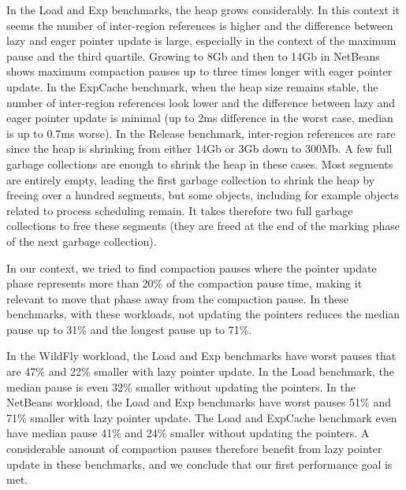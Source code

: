 \documentclass[sigplan,10pt,review,anonymous]{acmart}\settopmatter{printfolios=true,printccs=false,printacmref=false}
\newcommand{\egb}[1]{\color{blue}\fbox{\bfseries\sffamily\scriptsize Elisa:}{\sf\small$\blacktriangleright$\textit{#1}$\blacktriangleleft$}\color{black}}
\def\bestMedian{31\%\xspace}
\def\bestWorst{71\%\xspace}
\begin{document}
In the Load and Exp benchmarks, the heap grows considerably. In this context it seems the number of inter-region references is higher and the difference between lazy and eager pointer update is large, especially in the context of the maximum pause and the third quartile. Growing to 8Gb and then to 14Gb in NetBeans shows maximum compaction pauses up to three times longer with eager pointer update. In the ExpCache benchmark, when the heap size remains stable, the number of inter-region references look lower and the difference between lazy and eager pointer update is minimal (up to 2ms difference in the worst case, median is up to 0.7ms worse). In the Release benchmark, inter-region references are rare since the heap is shrinking from either 14Gb or 3Gb down to 300Mb. A few full garbage collections are enough to shrink the heap in these cases. Most segments are entirely empty, leading the first garbage collection to shrink the heap by freeing over a hundred segments, but some objects, including for example objects related to process scheduling remain. It takes therefore two full garbage collections to free these segments (they are freed at the end of the marking phase of the next garbage collection).

In our context, we tried to find compaction pauses where the pointer update phase represents more than 20\% of the compaction pause time, making it relevant to move that phase away from the compaction pause. In these benchmarks, with these workloads, not updating the pointers reduces the median pause up to \bestMedian and the longest pause up to \bestWorst. 

In the WildFly workload, the Load and Exp benchmarks have worst pauses that are 47\% and 22\% smaller with lazy pointer update. In the Load benchmark, the median pause is even 32\% smaller without updating the pointers. In the NetBeans workload, the Load and Exp benchmarks have worst pauses 51\% and 71\% smaller with lazy pointer update. The Load and ExpCache benchmark even have median pause 41\% and 24\% smaller without updating the pointers. A considerable amount of compaction pauses therefore benefit from lazy pointer update in these benchmarks, and we conclude that our first performance goal is met.
\end{document}
